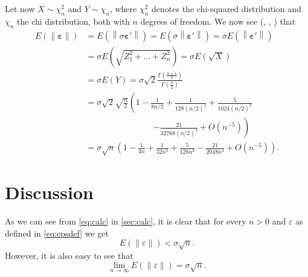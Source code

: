 \documentclass[12pt,a4]{article}
\newcommand{\lnorm}{\left\|}
\newcommand{\rnorm}{\right\|}
\newcommand{\eps}{\ensuremath{\varepsilon}}
\newcommand{\vc}[1]{\ensuremath{\bm{#1}}}
\begin{document}
Let now $X \sim \chi_n^2$ and $Y \sim \chi_n$, where $\chi_n^2$ denotes the chi-squared distribution and $\chi_n$ the chi distribution, both with $n$ degrees of freedom. We now see (\cite{handbook}, \cite{chi}, \cite{mathworld}) that
\begin{equation}
\label{eq:calc}
\begin{alignedat}{1}
E\left(\lnorm \vc{\eps} \rnorm \right)   &= E\left(\lnorm \sigma \vc{\eps'} \rnorm \right)   =
E\left(\sigma \lnorm \vc{\eps'} \rnorm \right) = \sigma E\left(\lnorm \vc{\eps'} \rnorm \right) \\
&= \sigma E\left(\sqrt{Z_1^2 + \ldots + Z_n^2} \right) = \sigma E\left(\sqrt{X} \right) \\
&= \sigma E\left( Y \right) = 
\sigma \sqrt{2}\frac{\Gamma\left(\frac{n+1}{2}\right)}{\Gamma\left(\frac{n}{2}\right)} \\
&= \sigma \sqrt{2} \sqrt{\frac{n}{2}} \left( 1 - \frac{1}{8 n/2} + \frac{1}{128 (n/2)^2} + \frac{5}{1024 (n/2)^3} \right. \\ & \qquad \qquad \qquad \qquad \left. - \frac{21}{32768 (n/2)^4} + O\left( n^{-5} \right) \right) \\
&= \sigma \sqrt{n} \left( 1 - \frac{1}{4 n} + \frac{1}{32 n^2} + \frac{5}{128 n^3} - \frac{21}{2048 n^4} + O\left( n^{-5} \right) \right) .
\end{alignedat}
\end{equation}

\section{Discussion}

As we can see from \cref{eq:calc} in \cref{sec:calc}, it is clear that for every $n > 0$ and $\eps$ as defined in \cref{eq:epsdef} we get
\begin{equation}
E \left( \lnorm \eps \rnorm \right) < \sigma \sqrt{n} .
\end{equation}
However, it is also easy to see that 
\begin{equation}
\lim_{n \rightarrow \infty} E \left( \lnorm \eps \rnorm \right) = \sigma \sqrt{n} .
\end{equation}
\end{document}
